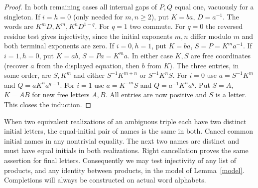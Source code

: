 \documentclass[11pt,a4paper]{article}
\begin{document}
\begin{proof}
In both remaining cases all internal gaps of $P,Q$ equal one, vacuously for a singleton. If $i=h=0$ (only needed for $m,n\ge2$), put $K=ba$, $D=a^{-1}$. The words are $K^mD,K^m,K^nD^{1-q}$. For $q=1$ two commute. For $q=0$ the reversed residue test gives injectivity, since the initial exponents $m,n$ differ modulo $m$ and both terminal exponents are zero. If $i=0,h=1$, put $K=ba$, $S=P=K^m a^{-1}$. If $i=1,h=0$, put $K=ab$, $S=Pa=K^m a$. In either case $K,S$ are free coordinates (recover $a$ from the displayed equation, then $b$ from $K$). The three entries, in some order, are $S,K^m$ and either $S^{-1}K^{m+n}$ or $S^{-1}K^nS$. For $i=0$ use $a=S^{-1}K^m$ and $Q=aK^n a^{q-1}$. For $i=1$ use $a=K^{-m}S$ and $Q=a^{-1}K^n a^q$. Put $S=A$, $K=AB$ for new free letters $A,B$. All entries are now positive and $S$ is a letter. This closes the induction.
\end{proof}
When two equivalent realizations of an ambiguous triple each have two distinct initial letters, the equal-initial pair of names is the same in both. Cancel common initial names in any nontrivial equality. The next two names are distinct and must have equal initials in both realizations. Right cancellation proves the same assertion for final letters. Consequently we may test injectivity of any list of products, and any identity between products, in the model of Lemma~\ref{model}. Completions will always be constructed on actual word alphabets.
\end{document}
